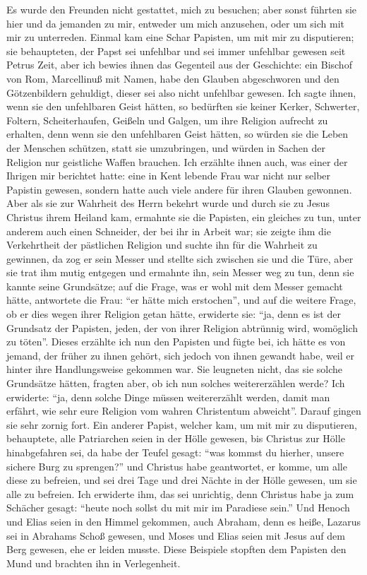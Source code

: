 Es wurde den Freunden nicht gestattet, mich zu besuchen;
aber sonst führten sie hier und da jemanden zu mir, entweder
um mich anzusehen, oder um sich mit mir zu unterreden. Einmal
kam eine Schar Papisten, um mit mir zu disputieren; sie 
behaupteten, der Papst sei unfehlbar 
und sei immer unfehlbar gewesen
seit Petrus Zeit, aber ich bewies ihnen das Gegenteil aus der
Geschichte: ein Bischof von Rom, Marcellinuß mit Namen, habe
den Glauben abgeschworen und den Götzenbildern gehuldigt, dieser
sei also nicht unfehlbar gewesen. Ich sagte ihnen, wenn sie den
unfehlbaren Geist hätten, so bedürften sie keiner Kerker, Schwerter,
Foltern, Scheiterhaufen, Geißeln und Galgen, um ihre Religion
aufrecht zu erhalten, denn wenn sie den unfehlbaren Geist hätten,
so würden sie die Leben der Menschen schützen, statt sie umzubringen, 
und würden in Sachen der Religion nur geistliche Waffen
brauchen. Ich erzählte ihnen auch, was einer der Ihrigen mir
berichtet hatte: eine in Kent lebende Frau war nicht nur selber
Papistin gewesen, sondern hatte auch viele andere für ihren
Glauben gewonnen. Aber als sie zur Wahrheit des Herrn bekehrt 
wurde und durch sie zu Jesus Christus ihrem Heiland kam,
ermahnte sie die Papisten, ein gleiches zu tun, unter anderem
auch einen Schneider, der bei ihr in Arbeit war; sie zeigte ihm
die Verkehrtheit der pästlichen Religion und suchte ihn für die
Wahrheit zu gewinnen, da zog er sein Messer und stellte sich
zwischen sie und die Türe, aber sie trat ihm mutig entgegen und
ermahnte ihn, sein Messer weg zu tun, denn sie kannte seine
Grundsätze; auf die Frage, was er wohl mit dem Messer gemacht 
hätte, antwortete die Frau: "`er hätte mich erstochen"', und
auf die weitere Frage, ob er dies wegen ihrer Religion getan
hätte, erwiderte sie: "`ja, denn es ist der Grundsatz der Papisten,
jeden, der von ihrer Religion abtrünnig wird, womöglich zu töten"'.
Dieses erzählte ich nun den Papisten und fügte bei, ich hätte es
von jemand, der früher zu ihnen gehört, sich jedoch von ihnen
gewandt habe, weil er hinter ihre Handlungsweise gekommen war.
Sie leugneten nicht, das sie solche Grundsätze hätten, fragten
aber, ob ich nun solches weitererzählen werde? Ich erwiderte:
"`ja, denn solche Dinge müssen weitererzählt werden, damit man
erfährt, wie sehr eure Religion vom wahren Christentum 
abweicht"'.
Darauf gingen sie sehr zornig fort. Ein anderer Papist, welcher
kam, um mit mir zu disputieren, behauptete, alle Patriarchen seien
in der Hölle gewesen, bis Christus zur Hölle hinabgefahren sei,
da habe der Teufel gesagt: "`was kommst du hierher, unsere sichere
Burg zu sprengen?"' und Christus habe geantwortet, er komme,
um alle diese zu befreien, und sei drei Tage und drei Nächte in
der Hölle gewesen, um sie alle zu befreien. Ich erwiderte ihm,
das sei unrichtig, denn Christus habe ja zum Schächer gesagt:
"`heute noch sollst du mit mir im Paradiese sein."' Und Henoch
und Elias seien in den Himmel gekommen, auch Abraham, denn
es heiße, Lazarus sei in Abrahams Schoß gewesen, und Moses
und Elias seien mit Jesus auf dem Berg gewesen, ehe er leiden
musste. Diese Beispiele stopften dem Papisten den Mund und
brachten ihn in Verlegenheit.

